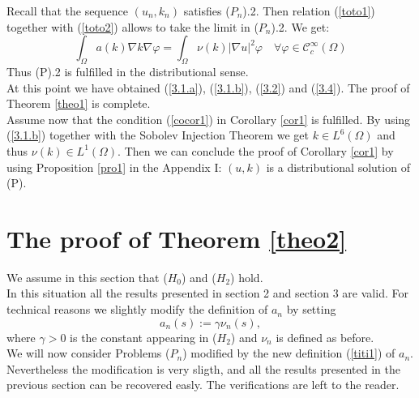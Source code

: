 \documentclass{elsart}
\begin{document}
Recall that the sequence $(u_n,k_n)$ satisfies ($P_n$).2. Then
relation (\ref{toto1}) together with (\ref{toto2}) allows to take the
limit in ($P_n$).2. We get: 
\begin{equation}
\int_{\Omega} a(k)\nabla k \nabla \varphi = 
\int_{\Omega} \nu(k)|\nabla u|^2 \varphi \quad \forall 
\varphi \in \mathcal{C}_{c}^{\infty}(\Omega) \label{3.4}
\end{equation}
Thus (P).2 is fulfilled in the distributional sense. \\ 
At this point we have obtained (\ref{3.1.a}), (\ref{3.1.b}), 
(\ref{3.2}) and (\ref{3.4}). The proof of Theorem \ref{theo1} is
complete. \\

Assume now that the condition (\ref{cocor1}) in Corollary \ref{cor1}
is fulfilled. By using (\ref{3.1.b}) together with the Sobolev
Injection Theorem we get $k\in L^{6}(\Omega)$ and thus 
$\nu(k)\in L^{1}(\Omega)$. Then we can conclude the proof of 
Corollary \ref{cor1} by using Proposition
\ref{pro1} in the Appendix I: $(u,k)$ is a distributional solution of (P).    

\section{The proof of Theorem \ref{theo2}} \label{sec4}

We assume in this section that ($H_0$) and ($H_2$) hold. \\ 
In this situation all the results presented in section 2 and section 3
are valid. For technical reasons we slightly modify the definition of
$a_n$ by setting 
\begin{equation}
a_n(s):=\gamma \nu_n(s), \label{titi1} 
\end{equation}
where $\gamma > 0$ is the constant appearing in ($H_2$) and 
$\nu_n$ is defined as before. \\ 
We will now consider Problems ($P_n$) modified by the new definition
(\ref{titi1}) of $a_n$. Nevertheless the modification is very sligth,
and all the results presented in the previous section can be recovered
easly. The verifications are left to the reader. \\ 
\end{document}
